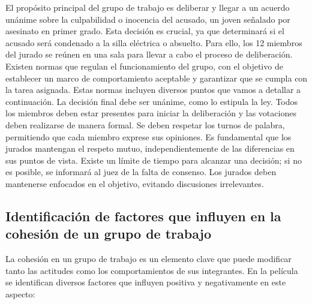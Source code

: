 \documentclass{article}
\begin{document}
El propósito principal del grupo de trabajo es deliberar y llegar a un acuerdo unánime sobre la culpabilidad o inocencia del acusado, un joven señalado por asesinato en primer grado. Esta decisión es crucial, ya que determinará si el acusado será condenado a la silla eléctrica o absuelto. Para ello, los 12 miembros del jurado se reúnen en una sala para llevar a cabo el proceso de deliberación.\\

Existen normas que regulan el funcionamiento del grupo, con el objetivo de establecer un marco de comportamiento aceptable y garantizar que se cumpla con la tarea asignada. Estas normas incluyen diversos puntos que vamos a detallar a continuación.
La decisión final debe ser unánime, como lo estipula la ley. Todos los miembros deben estar presentes para iniciar la deliberación y las votaciones deben realizarse de manera formal. Se deben respetar los turnos de palabra, permitiendo que cada miembro exprese sus opiniones. Es fundamental que los jurados mantengan el respeto mutuo, independientemente de las diferencias en sus puntos de vista. Existe un límite de tiempo para alcanzar una decisión; si no es posible, se informará al juez de la falta de consenso. Los jurados deben mantenerse enfocados en el objetivo, evitando discusiones irrelevantes.

\subsection{Identificación de factores que influyen en la cohesión de un grupo de trabajo}

La cohesión en un grupo de trabajo es un elemento clave que puede modificar tanto las actitudes como los comportamientos de sus integrantes. En la película se identifican diversos factores que influyen positiva y negativamente en este aspecto:
\end{document}
